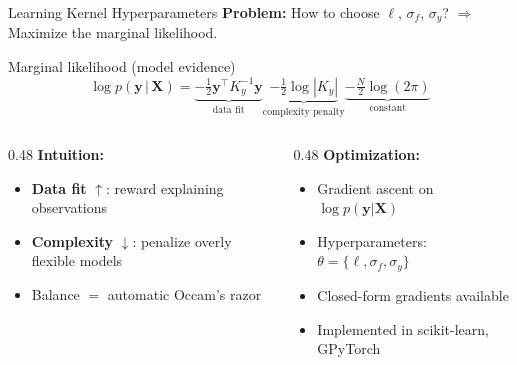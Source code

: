 \documentclass[aspectratio=169,11pt]{beamer}
\newcommand{\emphc}[1]{\textcolor{harvardcrimson}{#1}}
\newcommand{\X}{\bm{X}}
\begin{document}
\begin{frame}{Learning Kernel Hyperparameters}
\textbf{Problem:} How to choose $\ell$, $\sigma_f$, $\sigma_y$?  $\Rightarrow$ Maximize the \emphc{marginal likelihood}.

\vspace{0.2cm}
\begin{block}{Marginal likelihood (model evidence)}
\[
\log p(\bm{y}\,|\,\X) = \underbrace{-\tfrac{1}{2}\bm{y}^\top K_y^{-1}\bm{y}}_{\text{data fit}}
\underbrace{-\tfrac{1}{2}\log|K_y|}_{\text{complexity penalty}}
\underbrace{-\tfrac{N}{2}\log(2\pi)}_{\text{constant}}
\]
\end{block}

\vspace{0.1cm}
\begin{columns}[T]
\begin{column}{0.48\textwidth}
\textbf{Intuition:}
\begin{itemize}\setlength{\itemsep}{2pt}
  \item \textbf{Data fit} $\uparrow$: reward explaining observations
  \item \textbf{Complexity} $\downarrow$: penalize overly flexible models
  \item Balance $=$ \emphc{automatic Occam's razor}
\end{itemize}
\end{column}
\begin{column}{0.48\textwidth}
\textbf{Optimization:}
\begin{itemize}\setlength{\itemsep}{2pt}
  \item Gradient ascent on $\log p(\bm{y}|\X)$
  \item Hyperparameters: $\theta = \{\ell, \sigma_f, \sigma_y\}$
  \item Closed-form gradients available
  \item Implemented in scikit-learn, GPyTorch
\end{itemize}
\end{column}
\end{columns}
\end{frame}
\end{document}
